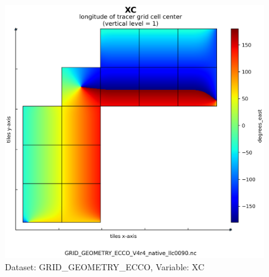 \begin{figure}[H]
\centering
\includegraphics[scale=0.55]{../images/plots/native_plots_coords/Geometry_Parameters_for_the_Lat-Lon-Cap_90_(llc90)_Native_Model_Grid_(Version_4_Release_4)/XC.png}
\caption{Dataset: GRID\_GEOMETRY\_ECCO, Variable: XC}
\label{tab:table-GRID_GEOMETRY_ECCO_XC-Plot}
\end{figure}
\newpage
\pagebreak
